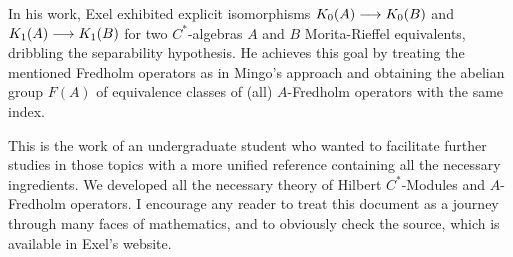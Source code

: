 In his work, Exel exhibited explicit isomorphisms $K_0(A)\longrightarrow K_0(B)$ and $K_1(A)\longrightarrow K_1(B)$ for two $C^*$-algebras $A$ and $B$ Morita-Rieffel equivalents, dribbling the separability hypothesis. He achieves this goal by treating the mentioned Fredholm operators as in Mingo's approach \cite{mingo1987K} and obtaining the abelian group $F(A)$ of equivalence classes of (all) $A$-Fredholm operators with the same index. 

This is the work of an undergraduate student who wanted to facilitate further studies in those topics with a more unified reference containing all the necessary ingredients. We developed all the necessary theory of Hilbert $C^*$-Modules and $A$-Fredholm operators. I encourage any reader to treat this document as a journey through many faces of mathematics, and to obviously check the source, which is available in Exel's website. 

